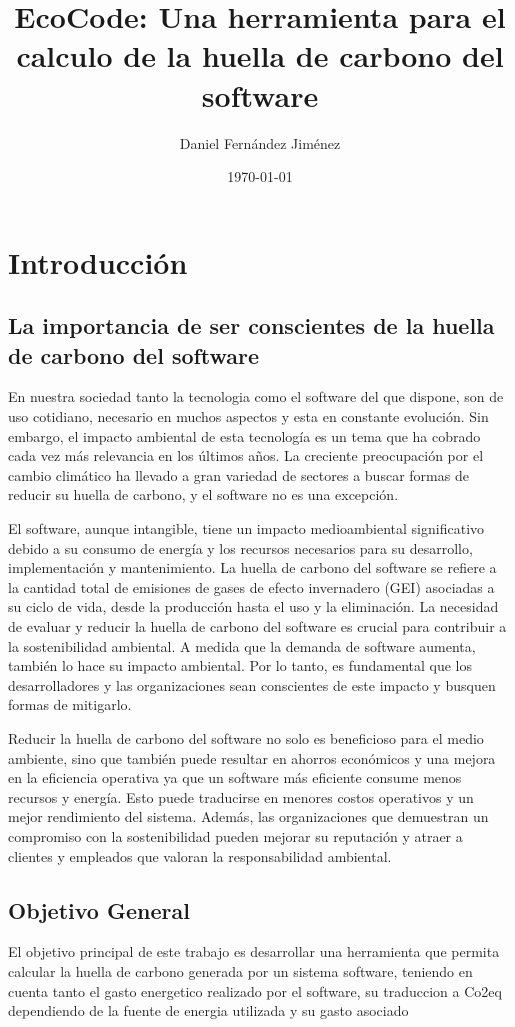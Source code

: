\documentclass[12pt,a4paper]{report}
\title{EcoCode: Una herramienta para el calculo de la huella de carbono del software}
\author{Daniel Fernández Jiménez}
\date{\today}
\begin{document}
\maketitle

\tableofcontents
\newpage

\chapter{Introducción}

\section{La importancia de ser conscientes de la huella de carbono del software}
En nuestra sociedad tanto la tecnologia como el software del que dispone, son de uso cotidiano, necesario en muchos aspectos y esta en constante evolución. Sin embargo, el impacto ambiental de esta tecnología 
es un tema que ha cobrado cada vez más relevancia en los últimos años. La creciente preocupación por el cambio climático ha llevado a gran variedad de sectores a buscar formas de reducir su huella de carbono, 
y el software no es una excepción.

El software, aunque intangible, tiene un impacto medioambiental significativo debido a su consumo de energía y los recursos necesarios para su desarrollo, implementación y mantenimiento. 
La huella de carbono del software se refiere a la cantidad total de emisiones de gases de efecto invernadero (GEI) asociadas a su ciclo de vida, desde la producción hasta el uso y la eliminación.
La necesidad de evaluar y reducir la huella de carbono del software es crucial para contribuir a la sostenibilidad ambiental. A medida que la demanda de software aumenta, también lo hace su impacto ambiental. 
Por lo tanto, es fundamental que los desarrolladores y las organizaciones sean conscientes de este impacto y busquen formas de mitigarlo.

Reducir la huella de carbono del software no solo es beneficioso para el medio ambiente, sino que también puede resultar en ahorros económicos y una mejora en la eficiencia operativa ya que un software más eficiente consume menos recursos y energía.
Esto puede traducirse en menores costos operativos y un mejor rendimiento del sistema. Además, las organizaciones que demuestran un compromiso con la sostenibilidad pueden mejorar su reputación y atraer a clientes y empleados que valoran la responsabilidad ambiental.

\section{Objetivo General}
El objetivo principal de este trabajo es desarrollar una herramienta que permita calcular la huella de carbono generada por un sistema software, teniendo en cuenta tanto el gasto energetico realizado por el software, su traduccion a Co2eq dependiendo de la fuente de energia utilizada y su gasto asociado
\end{document}
